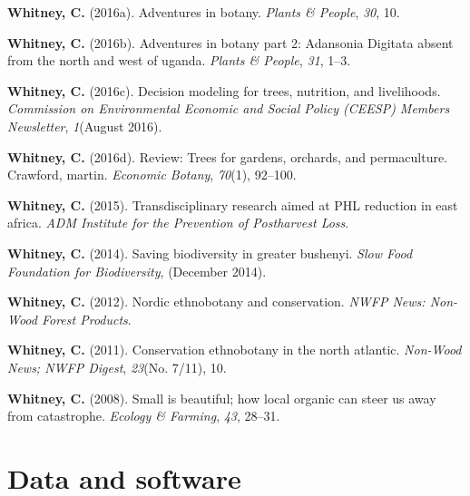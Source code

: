 \documentclass[11pt,a4paper,]{awesome-cv}
\newlength{\cslhangindent}
\newenvironment{CSLReferences}[2] %
 {\begin{list}{}{%
  \setlength{\itemindent}{0pt}
  \setlength{\leftmargin}{0pt}
  \setlength{\parsep}{0pt}
  \ifodd #1
   \setlength{\leftmargin}{\cslhangindent}
   \setlength{\itemindent}{-1\cslhangindent}
  \fi
  \setlength{\itemsep}{#2\baselineskip}}}
 {\end{list}}
\begin{document}
\begin{CSLReferences}{1}{0}
\textbf{Whitney, C.} (2016a). Adventures in botany. \emph{Plants \&
People}, \emph{30}, 10.

\textbf{Whitney, C.} (2016b). Adventures in botany part 2: Adansonia
Digitata absent from the north and west of uganda. \emph{Plants \&
People}, \emph{31}, 1--3.

\textbf{Whitney, C.} (2016c). Decision modeling for trees, nutrition,
and livelihoods. \emph{Commission on Environmental Economic and Social
Policy (CEESP) Members Newsletter}, \emph{1}(August 2016).

\textbf{Whitney, C.} (2016d). Review: Trees for gardens, orchards, and
permaculture. Crawford, martin. \emph{Economic Botany}, \emph{70}(1),
92--100.

\textbf{Whitney, C.} (2015). Transdisciplinary research aimed at PHL
reduction in east africa. \emph{ADM Institute for the Prevention of
Postharvest Loss}.

\textbf{Whitney, C.} (2014). Saving biodiversity in greater bushenyi.
\emph{Slow Food Foundation for Biodiversity}, (December 2014).

\textbf{Whitney, C.} (2012). Nordic ethnobotany and conservation.
\emph{NWFP News: Non-Wood Forest Products}.

\textbf{Whitney, C.} (2011). Conservation ethnobotany in the north
atlantic. \emph{Non-Wood News; NWFP Digest}, \emph{23}(No. 7/11), 10.

\textbf{Whitney, C.} (2008). Small is beautiful; how local organic can
steer us away from catastrophe. \emph{Ecology \& Farming}, \emph{43},
28--31.

\end{CSLReferences}

\section{Data and software}\label{data-and-software}
\end{document}
